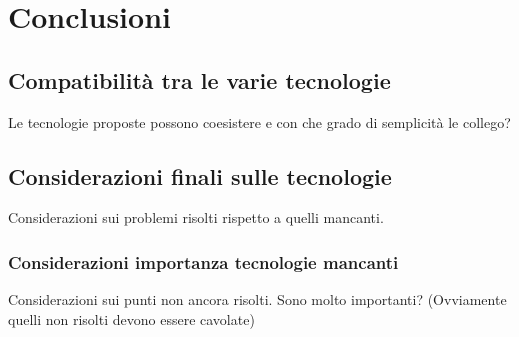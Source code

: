 \documentclass[./../Technology Baseline.tex]{subfiles}
\begin{document}
	
	\chapter{Conclusioni}
	\section{Compatibilità tra le varie tecnologie}
	Le tecnologie proposte possono coesistere e con che grado di semplicità  le collego?
	
	\section{Considerazioni finali sulle tecnologie}
	Considerazioni sui problemi risolti rispetto a quelli mancanti.
	
	\subsection{Considerazioni importanza tecnologie mancanti}
	Considerazioni sui punti non ancora risolti. Sono molto importanti? (Ovviamente quelli non risolti devono essere cavolate)
	
\end{document}
